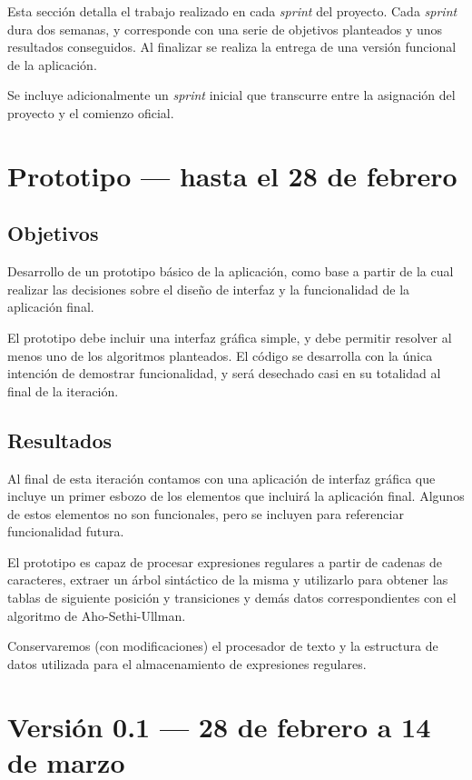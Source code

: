  \label{sec:Cappendix}

Esta sección detalla el trabajo realizado en cada \emph{sprint} del proyecto. Cada \emph{sprint} dura dos semanas, y corresponde con una serie de objetivos planteados y unos resultados conseguidos.
Al finalizar se realiza la entrega de una versión funcional de la aplicación.

Se incluye adicionalmente un \emph{sprint} inicial que transcurre entre la asignación del proyecto y el comienzo oficial.

\section{Prototipo --- hasta el 28 de febrero}

\subsection{Objetivos}
Desarrollo de un prototipo básico de la aplicación, como base a partir de la cual realizar las decisiones sobre el diseño de interfaz y la funcionalidad de la aplicación final.

El prototipo debe incluir una interfaz gráfica simple, y debe permitir resolver al menos uno de los algoritmos planteados. 
El código se desarrolla con la única intención de demostrar funcionalidad, y será desechado casi en su totalidad al final de la iteración.

\subsection{Resultados}
Al final de esta iteración contamos con una aplicación de interfaz gráfica que incluye un primer esbozo de los elementos que incluirá la aplicación final.
Algunos de estos elementos no son funcionales, pero se incluyen para referenciar funcionalidad futura.

El prototipo es capaz de procesar expresiones regulares a partir de cadenas de caracteres, extraer un árbol sintáctico de la misma y utilizarlo para obtener las tablas de siguiente posición y transiciones y demás datos correspondientes con el algoritmo de Aho-Sethi-Ullman.

Conservaremos (con modificaciones) el procesador de texto y la estructura de datos utilizada para el almacenamiento de expresiones regulares.

\section{Versión 0.1 --- 28 de febrero a 14 de marzo}
